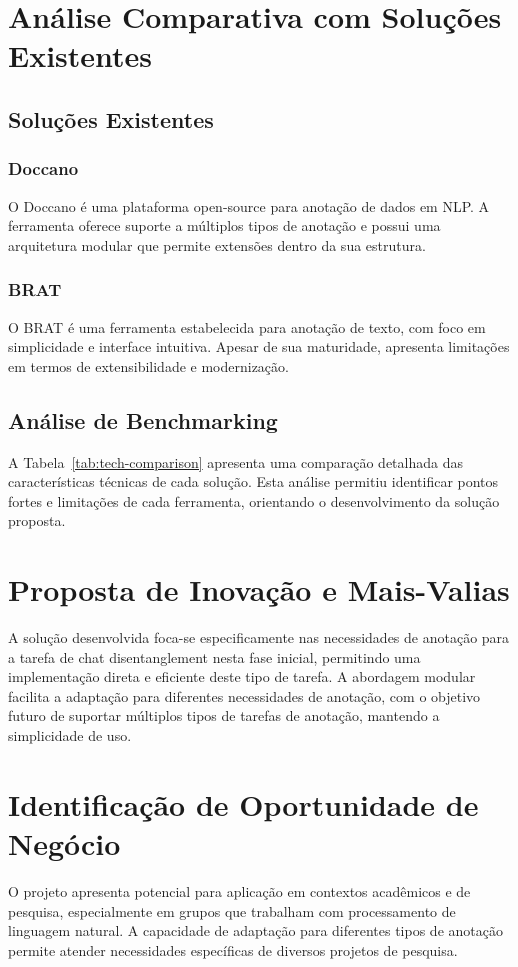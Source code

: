 \section{Análise Comparativa com Soluções Existentes}

\subsection{Soluções Existentes}

\subsubsection{Doccano}
O Doccano é uma plataforma open-source para anotação de dados em NLP. A ferramenta oferece suporte a múltiplos tipos de anotação e possui uma arquitetura modular que permite extensões dentro da sua estrutura.

\subsubsection{BRAT}
O BRAT é uma ferramenta estabelecida para anotação de texto, com foco em simplicidade e interface intuitiva. Apesar de sua maturidade, apresenta limitações em termos de extensibilidade e modernização.

\subsection{Análise de Benchmarking}

A Tabela~\ref{tab:tech-comparison} apresenta uma comparação detalhada das características técnicas de cada solução. Esta análise permitiu identificar pontos fortes e limitações de cada ferramenta, orientando o desenvolvimento da solução proposta.

\section{Proposta de Inovação e Mais-Valias}
A solução desenvolvida foca-se especificamente nas necessidades de anotação para a tarefa de chat disentanglement nesta fase inicial, permitindo uma implementação direta e eficiente deste tipo de tarefa. A abordagem modular facilita a adaptação para diferentes necessidades de anotação, com o objetivo futuro de suportar múltiplos tipos de tarefas de anotação, mantendo a simplicidade de uso.

\section{Identificação de Oportunidade de Negócio}
O projeto apresenta potencial para aplicação em contextos acadêmicos e de pesquisa, especialmente em grupos que trabalham com processamento de linguagem natural. A capacidade de adaptação para diferentes tipos de anotação permite atender necessidades específicas de diversos projetos de pesquisa.

